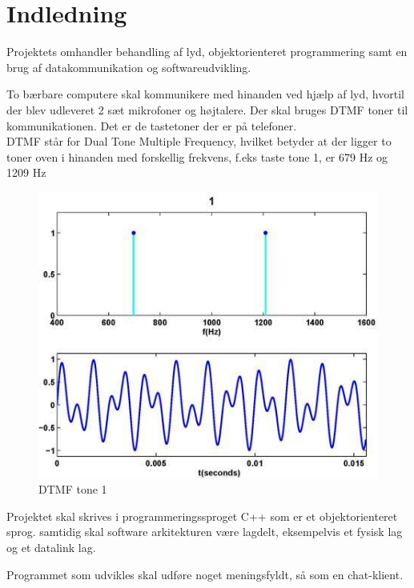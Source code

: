 \section{Indledning}
Projektets omhandler behandling af lyd, objektorienteret programmering samt en brug af datakommunikation og softwareudvikling.

To bærbare computere skal kommunikere med hinanden ved hjælp af lyd, hvortil der blev udleveret 2 sæt mikrofoner og højtalere.
Der skal bruges DTMF toner til kommunikationen. Det er de tastetoner der er på telefoner.\\%
DTMF står for Dual Tone Multiple Frequency, hvilket betyder at der ligger to toner oven i hinanden med forskellig frekvens, f.eks taste tone 1, er 679 Hz og 1209 Hz

\begin{figure}[h]
\centering
\includegraphics[scale=0.5]{Billeder/DTMF1.JPG}
\caption{DTMF tone 1}
\label{fig:DTMF1}
\end{figure}

Projektet skal skrives i programmeringssproget C++ som er et objektorienteret sprog.
samtidig skal software arkitekturen være lagdelt, eksempelvis et fysisk lag og et datalink lag.

Programmet som udvikles skal udføre noget meningsfyldt, så som en chat-klient.